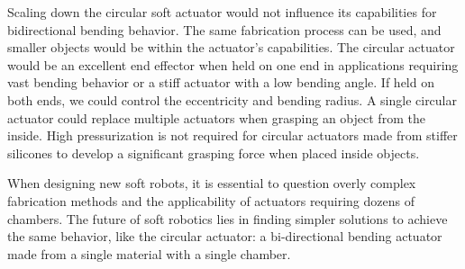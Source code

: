 Scaling down the circular soft actuator would not influence its capabilities for bidirectional bending behavior. The same fabrication process can be used, and smaller objects would be within the actuator's capabilities. The circular actuator would be an excellent end effector when held on one end in applications requiring vast bending behavior or a stiff actuator with a low bending angle. If held on both ends, we could control the eccentricity and bending radius. A single circular actuator could replace multiple actuators when grasping an object from the inside. High pressurization is not required for circular actuators made from stiffer silicones to develop a significant grasping force when placed inside objects.

When designing new soft robots, it is essential to question overly complex fabrication methods and the applicability of actuators requiring dozens of chambers. The future of soft robotics lies in finding simpler solutions to achieve the same behavior, like the circular actuator: a bi-directional bending actuator made from a single material with a single chamber.  